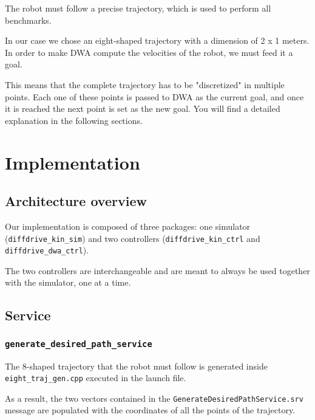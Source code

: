 \documentclass[11pt,a4paper]{article}
\begin{document}
The robot must follow a precise trajectory, which is used to perform all benchmarks.

In our case we chose an eight-shaped trajectory with a dimension of 2 x 1 meters.\\

In order to make DWA compute the velocities of the robot, we must feed it a goal.

This means that the complete trajectory has to be "discretized" in multiple points.
Each one of these points is passed to DWA as the current goal, and once it is reached the next point is set as the new goal. You will find a detailed explanation in the following sections.




\section{Implementation}

\subsection{Architecture overview}

Our implementation is composed of three packages: one simulator (\texttt{diffdrive\_kin\_sim}) and two controllers (\texttt{diffdrive\_kin\_ctrl} and \texttt{diffdrive\_dwa\_ctrl}).

The two controllers are interchangeable and are meant to always be used together with the simulator, one at a time.

\subsection{Service}

\subsubsection{\texttt{generate\_desired\_path\_service}}

The 8-shaped trajectory that the robot must follow is generated inside \texttt{eight\_traj\_gen.cpp} executed in the launch file.

As a result, the two vectors contained in the \texttt{GenerateDesiredPathService.srv} message are populated with the coordinates of all the points of the trajectory.
\end{document}
